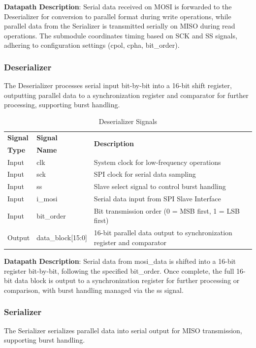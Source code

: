 \textbf{Datapath Description}: Serial data received on MOSI is forwarded to the Deserializer for conversion to parallel format during write operations, while parallel data from the Serializer is transmitted serially on MISO during read operations. The submodule coordinates timing based on SCK and SS signals, adhering to configuration settings (cpol, cpha, bit\_order).

\subsubsection{Deserializer}
The Deserializer processes serial input bit-by-bit into a 16-bit shift register, outputting parallel data to a synchronization register and comparator for further processing, supporting burst handling.

\begin{table}[!htb]
    \centering
    \caption{Deserializer Signals}
    \label{tab:deserializer-signals}
    \begin{tabular}{|m{}|m{}|m{}|}
        \hline
        \textbf{Signal} & \textbf{Signal} & \multirow{2}{*}{\textbf{Description}} \\
        \textbf{Type} & \textbf{Name} & \\
        \hline
        Input & clk & System clock for low-frequency operations \\
        Input & sck & SPI clock for serial data sampling \\
        Input & ss & Slave select signal to control burst handling \\
        Input & i\_mosi & Serial data input from SPI Slave Interface \\
        Input & bit\_order & Bit transmission order (0 = MSB first, 1 = LSB first) \\
        Output & data\_block[15:0] & 16-bit parallel data output to synchronization register and comparator \\
        \hline
    \end{tabular}
\end{table}

\textbf{Datapath Description}: Serial data from mosi\_data is shifted into a 16-bit register bit-by-bit, following the specified bit\_order. Once complete, the full 16-bit data block is output to a synchronization register for further processing or comparison, with burst handling managed via the ss signal.

\subsubsection{Serializer}
The Serializer serializes parallel data into serial output for MISO transmission, supporting burst handling.

